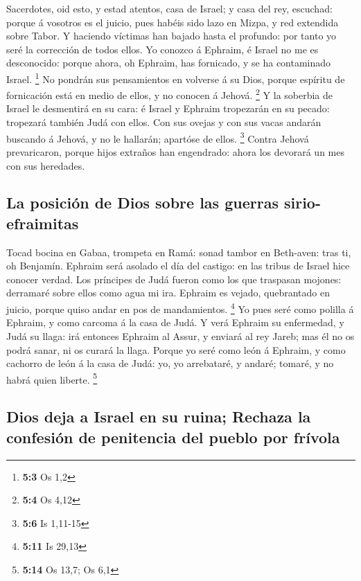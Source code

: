  Sacerdotes, oid esto, y estad atentos, casa de Israel; y
casa del rey, escuchad: porque á vosotros es el juicio, pues habéis sido
lazo en Mizpa, y red extendida sobre Tabor.  Y haciendo
víctimas han bajado hasta el profundo: por tanto yo seré la corrección
de todos ellos.  Yo conozco á Ephraim, é Israel no me es
desconocido: porque ahora, oh Ephraim, has fornicado, y se ha
contaminado Israel. \footnote{\textbf{5:3} Os 1,2}  No
pondrán sus pensamientos en volverse á su Dios, porque espíritu de
fornicación está en medio de ellos, y no conocen á Jehová. \footnote{\textbf{5:4}
  Os 4,12}  Y la soberbia de Israel le desmentirá en su
cara: é Israel y Ephraim tropezarán en su pecado: tropezará también Judá
con ellos.  Con sus ovejas y con sus vacas andarán buscando
á Jehová, y no le hallarán; apartóse de ellos. \footnote{\textbf{5:6} Is
  1,11-15}  Contra Jehová prevaricaron, porque hijos
extraños han engendrado: ahora los devorará un mes con sus heredades.

\hypertarget{la-posiciuxf3n-de-dios-sobre-las-guerras-sirio-efraimitas}{%
\subsection{La posición de Dios sobre las guerras
sirio-efraimitas}\label{la-posiciuxf3n-de-dios-sobre-las-guerras-sirio-efraimitas}}

 Tocad bocina en Gabaa, trompeta en Ramá: sonad tambor en
Beth-aven: tras ti, oh Benjamín.  Ephraim será asolado el
día del castigo: en las tribus de Israel hice conocer verdad.
 Los príncipes de Judá fueron como los que traspasan
mojones: derramaré sobre ellos como agua mi ira.  Ephraim
es vejado, quebrantado en juicio, porque quiso andar en pos de
mandamientos. \footnote{\textbf{5:11} Is 29,13}  Yo pues
seré como polilla á Ephraim, y como carcoma á la casa de Judá.
 Y verá Ephraim su enfermedad, y Judá su llaga: irá
entonces Ephraim al Assur, y enviará al rey Jareb; mas él no os podrá
sanar, ni os curará la llaga.  Porque yo seré como león á
Ephraim, y como cachorro de león á la casa de Judá: yo, yo arrebataré, y
andaré; tomaré, y no habrá quien liberte. \footnote{\textbf{5:14} Os
  13,7; Os 6,1}

\hypertarget{dios-deja-a-israel-en-su-ruina-rechaza-la-confesiuxf3n-de-penitencia-del-pueblo-por-fruxedvola}{%
\subsection{Dios deja a Israel en su ruina; Rechaza la confesión de
penitencia del pueblo por
frívola}\label{dios-deja-a-israel-en-su-ruina-rechaza-la-confesiuxf3n-de-penitencia-del-pueblo-por-fruxedvola}}

